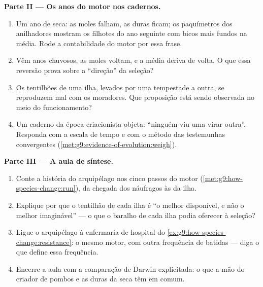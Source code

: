 \begin{problem}
\medskip\noindent\textbf{Parte II --- Os anos do motor nos
cadernos.}
\begin{enumerate}[resume]
  \item Um ano de seca: as  moles falham, as duras
        ficam; os paquímetros dos anilhadores mostram os
        filhotes do ano seguinte com bicos mais fundos na
        média. Rode a contabilidade do motor por essa frase.
  \item Vêm anos chuvosos, as  moles voltam, e a
        média deriva de volta. O que essa reversão prova
        sobre a ``direção'' da seleção?
  \item Os tentilhões de uma ilha, levados por uma tempestade
        a outra, se reproduzem mal com os moradores. Que
        proposição está sendo observada no meio do
        funcionamento?
  \item Um caderno da época criacionista objeta: ``ninguém
        viu uma  virar outra''. Responda com a escala
        de tempo e com o método das testemunhas convergentes
        (\cref{met:g9:evidence-of-evolution:weigh}).
\end{enumerate}

\medskip\noindent\textbf{Parte III --- A aula de síntese.}
\begin{enumerate}[resume]
  \item Conte a história do arquipélago nos cinco passos do
        motor (\cref{met:g9:how-species-change:run}), da
        chegada dos náufragos às  da ilha.
  \item Explique por que o tentilhão de cada ilha é ``o
        melhor disponível, e não o melhor imaginável'' --- o
        que o baralho de cada ilha podia oferecer à seleção?
  \item Ligue o arquipélago à enfermaria de hospital do
        \cref{ex:g9:how-species-change:resistance}: o mesmo
        motor, com outra frequência de batidas --- diga o que
        define essa frequência.
  \item Encerre a aula com a comparação de Darwin
        explicitada: o que a mão do criador de pombos e as
         duras da seca têm em comum.
\end{enumerate}
\end{problem}
